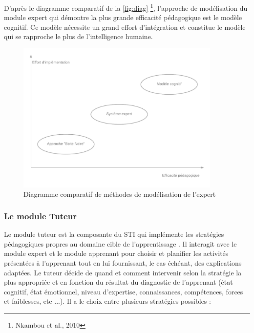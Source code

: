 D'après le diagramme comparatif de la \autoref{fig:diag} \footnote{Nkambou et al., 2010}, l'approche de modélisation du module expert qui démontre la plus grande efficacité pédagogique est le modèle cognitif. Ce modèle nécessite un grand effort d'intégration et constitue le modèle qui se rapproche le plus de l'intelligence humaine.

\begin{figure}
    \centering
    \includegraphics[width=0.9\textwidth]{figures/mod_expert.png}
    \captionsetup{justification=centering}
    \caption{Diagramme comparatif de méthodes de modélisation de l'expert}
 \label{fig:diag}
\end{figure}

\subsubsection{Le module Tuteur}
Le module tuteur est la composante du STI qui implémente les stratégies pédagogiques propres au domaine cible de l'apprentissage . Il interagit avec le module expert et le module apprenant pour choisir et planifier les activités présentées à l'apprenant tout en lui fournissant, le cas échéant, des explications adaptées. Le tuteur décide de quand et comment intervenir selon la stratégie la plus appropriée et en fonction du résultat du diagnostic de l'apprenant (état cognitif, état
émotionnel, niveau d'expertise, connaissances, compétences, forces et faiblesses, etc ...). Il a le choix entre plusieurs stratégies possibles :

